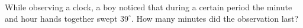 While observing a clock, a boy noticed that during a certain period the minute and hour hands together swept $39^{\circ}$. How many minutes did the observation last?
